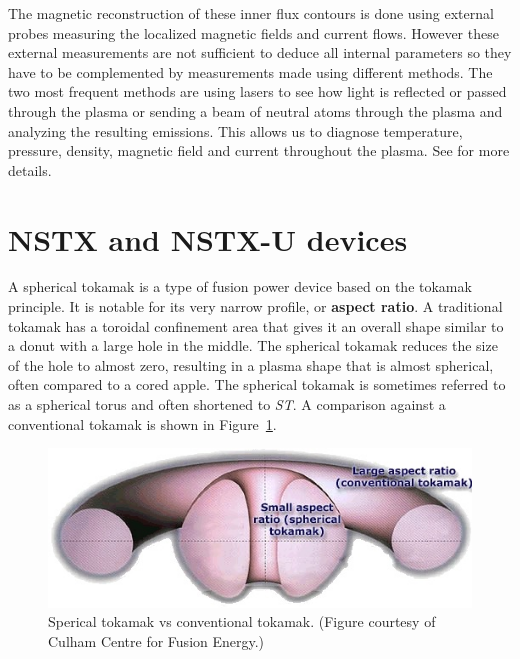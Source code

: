 \documentclass[12pt,lot, lof]{puthesis}
\begin{document}
The magnetic reconstruction of these inner flux contours is done using external probes measuring the localized magnetic fields and current flows. However these external measurements are not sufficient to deduce all internal parameters so they have to be complemented by measurements made using different methods. The two most frequent methods are using lasers to see how light is reflected or passed through the plasma or sending a beam of neutral atoms through the plasma and analyzing the resulting emissions.
This allows us to diagnose temperature, pressure, density, magnetic field and current throughout the plasma. See \cite{Equipe78, Orlinskij88, Matthews94, McKee99, Hutchinson02} for more details.

\section{NSTX and NSTX-U devices}

A spherical tokamak is a type of fusion power device based on the tokamak principle. It is notable for its very narrow profile, or \textbf{aspect ratio}. A traditional tokamak has a toroidal confinement area that gives it an overall shape similar to a donut with a large hole in the middle. The spherical tokamak reduces the size of the hole to almost zero, resulting in a plasma shape that is almost spherical, often compared to a cored apple. The spherical tokamak is sometimes referred to as a spherical torus and often shortened to \emph{ST}. A comparison against a conventional tokamak is shown in Figure~\ref{nstx1}.

\begin{figure}
\centering
\includegraphics[width= 0.7\linewidth]{nstx}
\caption{Sperical tokamak vs conventional tokamak. (Figure courtesy of Culham Centre for Fusion Energy.)}
\label{nstx1}
\end{figure}
\end{document}
